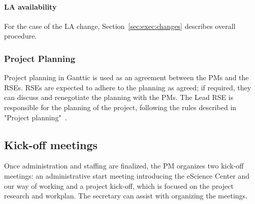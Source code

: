 \paragraph{LA availability} For the case of the LA change, Section~\ref{sec:exec:changes} describes overall procedure.

\subsubsection{Project Planning}
\label{init:planning}
Project planning in Ganttic is used as an agreement between the PMs and the RSEs. RSEs are expected to adhere to the
planning as agreed; if required, they can discuss and renegotiate the planning with the PMs.
The Lead RSE is responsible for the planning of the project, following the rules described in "Project planning"~\cite{planning-intranet}.






\subsection{Kick-off meetings}
Once administration and staffing are finalized, the PM organizes two kick-off meetings: an administrative start meeting
introducing the eScience Center and our way of working and a project kick-off, which is focused on the project research
and workplan. The secretary can assist with organizing the meetings.

